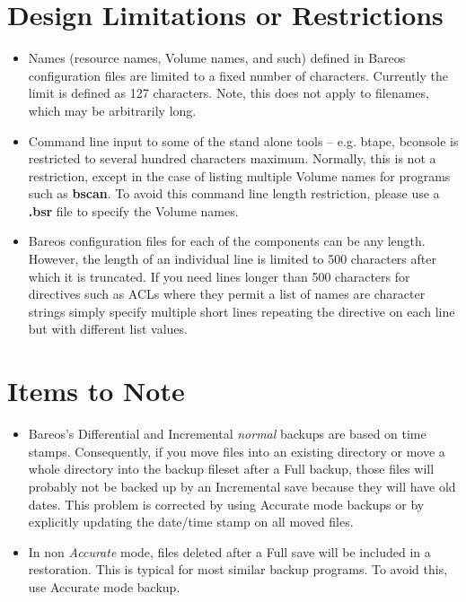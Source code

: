 \section{Design Limitations or Restrictions}

\begin{itemize}
\item Names (resource names, Volume names, and such) defined in Bareos
   configuration files are limited to a fixed number of
   characters.  Currently the limit is defined as 127 characters.  Note,
   this does not apply to filenames, which may be arbitrarily long.
\item Command line input to some of the stand alone tools -- e.g. btape,
   bconsole is restricted to several hundred characters maximum.
   Normally, this is not a restriction, except in the case of listing
   multiple Volume names for programs such as {\bf bscan}. To avoid
   this command line length restriction, please use a {\bf .bsr}
   file to specify the Volume names.
\item Bareos configuration files for each of the components can be
   any length. However, the length of an individual line is limited
   to 500 characters after which it is truncated.  If you need lines
   longer than 500 characters for directives such as ACLs where
   they permit a list of names are character strings simply
   specify multiple short lines repeating the directive on
   each line but with different list values.

\end{itemize}

\section{Items to Note}
\begin{itemize}
\item Bareos's Differential and Incremental \textsl{normal} backups are based
  on time stamps.  Consequently, if you move files into an existing directory
  or move a whole directory into the backup fileset after a Full backup, those
  files will probably not be backed up by an Incremental save because they will
  have old dates.  This problem is corrected by using Accurate mode backups
  or by explicitly updating the date/time stamp on all moved files.
\item In non \textsl{Accurate} mode, files deleted after a Full save will be
  included in a restoration. This is typical for most similar backup programs.
  To avoid this, use Accurate mode backup.
\end{itemize}
